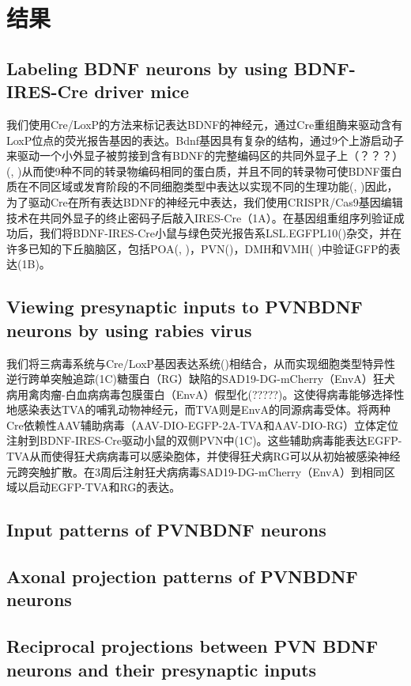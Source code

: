\chapter{结果}\label{chap:results}

\section{Labeling BDNF neurons by using BDNF-IRES-Cre driver mice}
我们使用Cre/LoxP的方法来标记表达BDNF的神经元，通过Cre重组酶来驱动含有LoxP位点的荧光报告基因的表达。Bdnf基因具有复杂的结构，通过9个上游启动子来驱动一个小外显子被剪接到含有BDNF的完整编码区的共同外显子上（？？？）(\cite{timmusk1993multiple}, \cite{altieri2004expression})从而使9种不同的转录物编码相同的蛋白质，并且不同的转录物可使BDNF蛋白质在不同区域或发育阶段的不同细胞类型中表达以实现不同的生理功能(\cite{sakata2009critical}, \cite{maynard2016functional})因此，为了驱动Cre在所有表达BDNF的神经元中表达，我们使用CRISPR/Cas9基因编辑技术在共同外显子的终止密码子后敲入IRES-Cre（\figurename{1A}）。在基因组重组序列验证成功后，我们将BDNF-IRES-Cre小鼠与绿色荧光报告系LSL.EGFPL10(\cite{stanley2013profiling})杂交，并在许多已知的下丘脑脑区，包括POA(\cite{tan2016warm}, \cite{zhao2017hypothalamic})，PVN(\cite{an2015discrete})，DMH和VMH(\cite{unger2007selective,} \cite{wang2010brain})中验证GFP的表达(\figurename{1B})。

\section{Viewing presynaptic inputs to PVNBDNF neurons by using rabies virus}
我们将三病毒系统与Cre/LoxP基因表达系统(\cite{wickersham2007monosynaptic})相结合，从而实现细胞类型特异性逆行跨单突触追踪(\figurename{1C})糖蛋白（RG）缺陷的SAD19-DG-mCherry（EnvA）狂犬病用禽肉瘤-白血病病毒包膜蛋白（EnvA）假型化(?????)。这使得病毒能够选择性地感染表达TVA的哺乳动物神经元，而TVA则是EnvA的同源病毒受体。将两种Cre依赖性AAV辅助病毒（AAV-DIO-EGFP-2A-TVA和AAV-DIO-RG）立体定位注射到BDNF-IRES-Cre驱动小鼠的双侧PVN中(\figurename{1C})。这些辅助病毒能表达EGFP-TVA从而使得狂犬病病毒可以感染胞体，并使得狂犬病RG可以从初始被感染神经元跨突触扩散。在3周后注射狂犬病病毒SAD19-DG-mCherry（EnvA）到相同区域以启动EGFP-TVA和RG的表达。

\section{Input patterns of PVNBDNF neurons}


\section{Axonal projection patterns of PVNBDNF neurons}

\section{Reciprocal projections between PVN BDNF neurons and their presynaptic inputs}